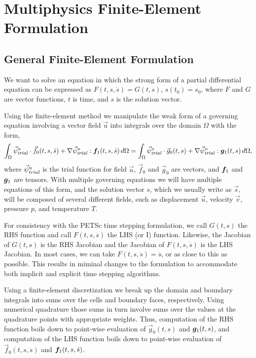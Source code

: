 \chapter{Multiphysics Finite-Element Formulation}
\label{cha:multiphysics:formulation}

\section{General Finite-Element Formulation}

We want to solve an equation in which the strong form of a partial
differential equation can be expressed as $F(t,s,\dot{s}) = G(t,s)$,
$s(t_0) = s_0$, where $F$ and $G$ are vector functions, $t$ is time,
and $s$ is the solution vector.

Using the finite-element method we manipulate the weak form of a
governing equation involving a vector field $\vec{u}$ into integrals
over the domain $\Omega$ with the form,
\begin{equation}
  \label{eqn:problem:form}
  \int_\Omega \trialvec[u] \cdot \vec{f}_0(t,s,\dot{s}) + \nabla \trialvec[u] : \tensor{f}
_1(t,s,\dot{s}) \, 
d\Omega =
  \int_\Omega \trialvec[u] \cdot \vec{g}_0(t,s) + \nabla \trialvec[u] : \tensor{g}_1(t,s) \, 
d\Omega,
\end{equation}
where $\trialvec[u]$ is the trial function for field $\vec{u}$,
$\vec{f}_0$ and $\vec{g}_0$ are vectors, and $\tensor{f}_1$ and
$\tensor{g}_1$ are tensors. With multiple governing equations we will
have multiple equations of this form, and the solution vector $s$,
which we usually write as $\vec{s}$, will be composed of several
different fields, such as displacement $\vec{u}$, velocity $\vec{v}$,
pressure $p$, and temperature $T$.

For consistency with the PETSc time stepping formulation, we call
$G(t,s)$ the RHS function and call $F(t,s,\dot{s})$ the LHS (or I)
function. Likewise, the Jacobian of $G(t,s)$ is the RHS Jacobian and
the Jacobian of $F(t,s,\dot{s})$ is the LHS Jacobian. In most cases, we
can take $F(t,s,\dot{s}) = \dot{s}$, or as close to this as
possible. This results in miminal changes to the formulation to
accommodate both implicit and explicit time stepping algorithms.

Using a finite-element discretization we break up the domain and
boundary integrals into sums over the cells and boundary faces,
respectively. Using numerical quadrature those sums in turn involve
sums over the values at the quadrature points with appropriate
weights. Thus, computation of the RHS function boils down to
point-wise evaluation of $\vec{g}_0(t,s)$ and $\tensor{g}_1(t,s)$, and
computation of the LHS function boils down to point-wise evaluation of
$\vec{f}_0(t,s,\dot{s})$ and $\tensor{f}_1(t,s,\dot{s})$.

